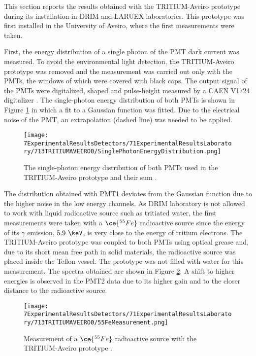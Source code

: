 This section reports the results obtained with the TRITIUM-Aveiro prototype during its installation in DRIM and LARUEX laboratories. This prototype was first installed in the University of Aveiro, where the first measurements were taken. 

First, the energy distribution of a single photon of the PMT dark current was measured. To avoid the environmental light detection, the TRITIUM-Aveiro prototype was removed and the measurement was carried out only with the PMTs, the windows of which were covered with black caps. The output signal of the PMTs were digitalized, shaped and pulse-height measured by a CAEN V1724 digitalizer \cite{CAENV1724}. The single-photon energy distribution of both PMTs is shown in Figure \ref{fig:SinglePhotonEnergyDistribution} in which a fit to a Gaussian function was fitted. Due to the electrical noise of the PMT, an extrapolation (dashed line) was needed to be applied.

\begin{figure}[h]
\centering
\texttt{[image: 7ExperimentalResultsDetectors/71ExperimentalResultsLaboratory/713TRITIUMAVEIRO0/SinglePhotonEnergyDistribution.png]}
\caption{The single-photon energy distribution of both PMTs used in the TRITIUM-Aveiro prototype and their sum \cite{ExperimentalPaperCarlos}.\label{fig:SinglePhotonEnergyDistribution}}
\end{figure}

The distribution obtained with PMT1 deviates from the Gaussian function due to the higher noise in the low energy channels. As DRIM laboratory is not allowed to work with liquid radioactive source such as tritiated water, the first measurements were taken with a $\ce{^{55}Fe}$ radioactive source since the energy of its $\gamma$ emission, $5.9~\keV$, is very close to the energy of tritium electrons. The TRITIUM-Aveiro prototype was coupled to both PMTs using optical grease and, due to its short mean free path in solid materials, the radioactive source was placed inside the Teflon vessel. The prototype was not filled with water for this measurement. The spectra obtained are shown in Figure \ref{fig:55FeMeasurement}. A shift to higher energies is observed in the PMT2 data due to its higher gain and to the closer distance to the radioactive source.

\begin{figure}[h]
\centering
\texttt{[image: 7ExperimentalResultsDetectors/71ExperimentalResultsLaboratory/713TRITIUMAVEIRO0/55FeMeasurement.png]}
\caption{Measurement of a $\ce{^{55}Fe}$ radioactive source with the TRITIUM-Aveiro prototype \cite{ExperimentalPaperCarlos}.\label{fig:55FeMeasurement}}
\end{figure}

